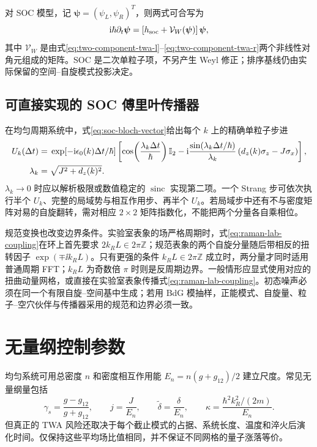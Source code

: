对 SOC 模型，记 $\bm\psi=(\psi_L,\psi_R)^T$，则两式可合写为
\begin{equation}
  \mathrm{i}\hbar\partial_t\bm\psi
  =\left[h_{\rm soc}+\mathcal V_W(\bm\psi)\right]\bm\psi,
  \label{eq:soc-spinor-twa}
\end{equation}
其中 $\mathcal V_W$ 是由式\eqref{eq:two-component-twa-l}--\eqref{eq:two-component-twa-r}两个非线性对角元组成的矩阵。SOC 是二次单粒子项，不另产生 Weyl 修正；排序基线仍由实际保留的空间--自旋模式投影决定。

\subsection{可直接实现的 SOC 傅里叶传播器}

在均匀周期系统中，式\eqref{eq:soc-bloch-vector}给出每个 $k$ 上的精确单粒子步进
\begin{align}
  U_k(\Delta t)={}&\exp[-\mathrm{i}\epsilon_0(k)\Delta t/\hbar]
  \left[
  \cos\!\left(\frac{\lambda_k\Delta t}{\hbar}\right)\mathbb{I}_2
  -\mathrm{i}\frac{\sin(\lambda_k\Delta t/\hbar)}{\lambda_k}
  \left(d_z(k)\sigma_z-J\sigma_x\right)
  \right],
  \label{eq:soc-fourier-propagator}\\
  \lambda_k={}&\sqrt{J^2+d_z(k)^2}.
\end{align}
$\lambda_k\to0$ 时应以解析极限或数值稳定的 $\operatorname{sinc}$ 实现第二项。一个 Strang 步可依次执行半个 $U_k$、完整的局域势与相互作用步、再半个 $U_k$。若局域步中还有不与密度矩阵对易的自旋翻转，需对相应 $2\times2$ 矩阵指数化，不能把两个分量各自乘相位。

规范变换也改变边界条件。实验室表象的场严格周期时，式\eqref{eq:raman-lab-coupling}在环上首先要求 $2k_RL\in2\pi\mathbb Z$；规范表象的两个自旋分量随后带相反的扭转因子 $\exp(\mp\ii k_RL)$。只有更强的条件 $k_RL\in2\pi\mathbb Z$ 成立时，两分量才同时适用普通周期 FFT；$k_RL$ 为奇数倍 $\pi$ 时则是反周期边界。一般情形应显式使用对应的扭曲动量网格，或直接在实验室表象传播式\eqref{eq:raman-lab-coupling}。初态噪声必须在同一个有限自旋--空间基中生成；若用 BdG 模抽样，正能模式、自旋量、粒子--空穴伙伴与传播器采用的规范和边界必须一致。

\section{无量纲控制参数}

均匀系统可用总密度 $n$ 和密度相互作用能
$E_n=n(g+g_{12})/2$ 建立尺度。常见无量纲量包括
\begin{equation}
  \gamma_s=\frac{g-g_{12}}{g+g_{12}},
  \qquad
  j=\frac{J}{E_n},
  \qquad
  \tilde\delta=\frac{\delta}{E_n},
  \qquad
  \kappa=\frac{\hbar^2k_R^2/(2m)}{E_n}.
\end{equation}
但真正的 TWA 风险还取决于每个截止模式的占据、系统长度、温度和淬火后演化时间。仅保持这些平均场比值相同，并不保证不同网格的量子涨落等价。

